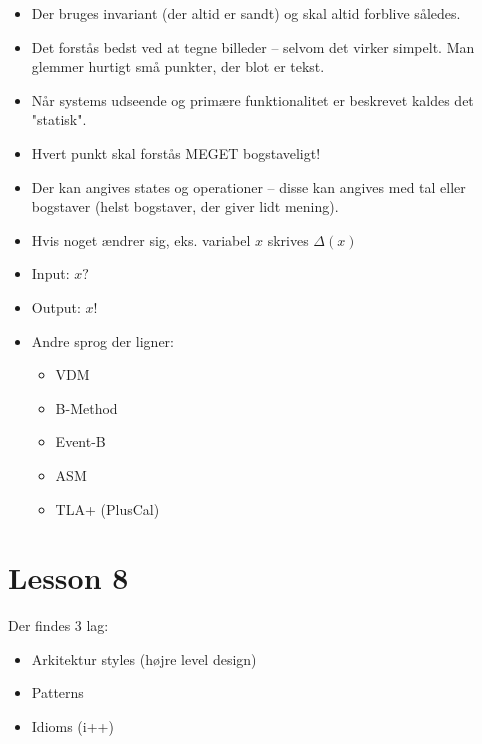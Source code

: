 \documentclass[a4, 10pt]{article}
\begin{document}
\begin{itemize}
	\item Der bruges invariant (der altid er sandt) og skal altid forblive således.
	\item Det forstås bedst ved at tegne billeder -- selvom det virker simpelt.
	\subitem Man glemmer hurtigt små punkter, der blot er tekst.
	\item Når systems udseende og primære funktionalitet er beskrevet kaldes det "statisk".
	\item Hvert punkt skal forstås MEGET bogstaveligt!
	\item Der kan angives states og operationer -- disse kan angives med tal eller bogstaver (helst bogstaver, der giver lidt mening).
	\item Hvis noget ændrer sig, eks. variabel $x$ skrives $\Delta(x)$
	\item Input: $x?$
	\item Output: $x!$
	\item Andre sprog der ligner:

	\begin{itemize}
		\item VDM
		\item B-Method
		\item Event-B
		\item ASM
		\item TLA+ (PlusCal)
	\end{itemize}
\end{itemize}




\newpage
\section*{Lesson 8}

Der findes 3 lag:
\begin{itemize}
	\item Arkitektur styles (højre level design)
	\item Patterns
	\item Idioms (i++)
\end{itemize}
\end{document}
